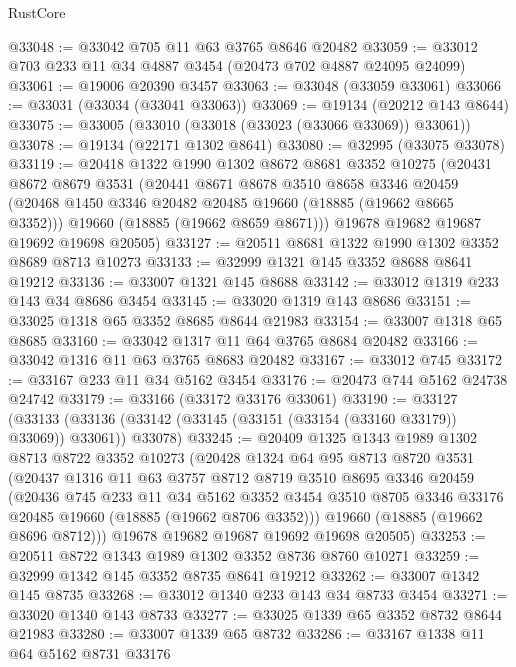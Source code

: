 \begin{lexlean}{RustCore}
\begin{coremodule}
@33048 := @33042 @705 @11 @63 @3765 @8646 @20482
@33059 := @33012 @703 @233 @11 @34 @4887 @3454 (@20473 @702 @4887 @24095 @24099)
@33061 := @19006 @20390 @3457
@33063 := @33048 (@33059 @33061)
@33066 := @33031 (@33034 (@33041 @33063))
@33069 := @19134 (@20212 @143 @8644)
@33075 := @33005 (@33010 (@33018 (@33023 (@33066 @33069)) @33061))
@33078 := @19134 (@22171 @1302 @8641)
@33080 := @32995 (@33075 @33078)
@33119 := @20418
    @1322
    @1990
    @1302
    @8672
    @8681
    @3352
    @10275
    (@20431
      @8672
      @8679
      @3531
      (@20441
        @8671
        @8678
        @3510
        @8658
        @3346
        @20459
        (@20468 @1450 @3346 @20482 @20485 @19660 (@18885 (@19662 @8665 @3352)))
        @19660
        (@18885 (@19662 @8659 @8671)))
      @19678
      @19682
      @19687
      @19692
      @19698
      @20505)
@33127 := @20511 @8681 @1322 @1990 @1302 @3352 @8689 @8713 @10273
@33133 := @32999 @1321 @145 @3352 @8688 @8641 @19212
@33136 := @33007 @1321 @145 @8688
@33142 := @33012 @1319 @233 @143 @34 @8686 @3454
@33145 := @33020 @1319 @143 @8686
@33151 := @33025 @1318 @65 @3352 @8685 @8644 @21983
@33154 := @33007 @1318 @65 @8685
@33160 := @33042 @1317 @11 @64 @3765 @8684 @20482
@33166 := @33042 @1316 @11 @63 @3765 @8683 @20482
@33167 := @33012 @745
@33172 := @33167 @233 @11 @34 @5162 @3454
@33176 := @20473 @744 @5162 @24738 @24742
@33179 := @33166 (@33172 @33176 @33061)
@33190 := @33127
    (@33133 (@33136 (@33142 (@33145 (@33151 (@33154 (@33160 @33179)) @33069)) @33061)) @33078)
@33245 := @20409
    @1325
    @1343
    @1989
    @1302
    @8713
    @8722
    @3352
    @10273
    (@20428
      @1324
      @64
      @95
      @8713
      @8720
      @3531
      (@20437
        @1316
        @11
        @63
        @3757
        @8712
        @8719
        @3510
        @8695
        @3346
        @20459
        (@20436
          @745
          @233
          @11
          @34
          @5162
          @3352
          @3454
          @3510
          @8705
          @3346
          @33176
          @20485
          @19660
          (@18885 (@19662 @8706 @3352)))
        @19660
        (@18885 (@19662 @8696 @8712)))
      @19678
      @19682
      @19687
      @19692
      @19698
      @20505)
@33253 := @20511 @8722 @1343 @1989 @1302 @3352 @8736 @8760 @10271
@33259 := @32999 @1342 @145 @3352 @8735 @8641 @19212
@33262 := @33007 @1342 @145 @8735
@33268 := @33012 @1340 @233 @143 @34 @8733 @3454
@33271 := @33020 @1340 @143 @8733
@33277 := @33025 @1339 @65 @3352 @8732 @8644 @21983
@33280 := @33007 @1339 @65 @8732
@33286 := @33167 @1338 @11 @64 @5162 @8731 @33176

\end{coremodule}
\end{lexlean}
